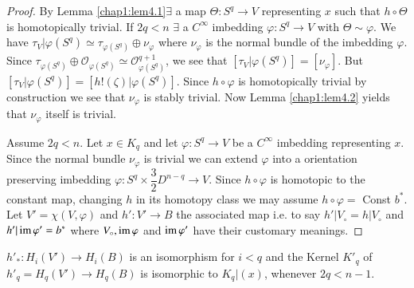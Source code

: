  \begin{proof}
By Lemma \ref{chap1:lem4.1}\pageoriginale $\exists $ a map $\Theta :
S^q \rightarrow V$ 
representing $x$ such that $h \circ \Theta$ is homotopically trivial. If
$2 q< n$  $\exists$ a $C^\infty $ imbedding $\varphi : S^q \rightarrow V$
with $\Theta \sim \varphi$. We have $\tau_V | \varphi (S^q )\simeq
\tau_{\varphi (S^q)} \oplus \nu_\varphi$ where $\nu_\varphi$ is the
normal bundle of the imbedding $\varphi$. Since $\tau_{\varphi
  (S^q)} \oplus \mathscr{O}_{\varphi (S^q)}\simeq
\mathscr{O}^{q+1}_{\varphi(S^q)}$, we see that $[ \tau_V | \varphi (S^q) ] =
[\nu_\varphi]$. But
$[\tau_V | \varphi (S^q) ] = [h! (\zeta)|\varphi (S^q) ]$. Since $h \circ
\varphi $ is homotopically trivial by construction we see that
$\nu_\varphi $ is stably trivial. Now Lemma \ref{chap1:lem4.2} yields that
$\nu_\varphi $ itself is trivial.  
 
 Assume $2q<n$. Let $x \in K_q$ and let $\varphi :S^q
 \rightarrow V$ be a $C^\infty$ imbedding representing $x$. Since
 the normal bundle $\nu_\varphi$ is trivial we can extend $\varphi$
 into a orientation preserving imbedding $\varphi : S^q \times
 \dfrac{3}{2} D^{n-q}\rightarrow V$. Since $h \circ \varphi$ is homotopic
 to the constant map, changing $h$ in its homotopy class we may assume
 $h \circ \varphi = $ Const $b^*$. Let $V' = \chi (V, \varphi)$ and $h'
 :V' \rightarrow B$ the associated map i.e. to say $h' | V_\circ = h |
 V_\circ $ and $h'| \operatorname{im} \varphi' = b^*$ where $V_\circ, \operatorname{im} \varphi$ and
 $\operatorname{im} \varphi'$ have their customary meanings.  
 \end{proof}

\setcounter{prop}{3}
\begin{prop}\label{chap1:prop4.4}%
$h'_* : H_i (V') \rightarrow H_i (B) $ is an isomorphism for $i<q$
  and the Kernel $K'_q$ of $h'_q = H_q(V') \rightarrow H_q (B)$ is
  isomorphic to $K_q| (x)$, whenever $2q< n-1$. 
\end{prop}

